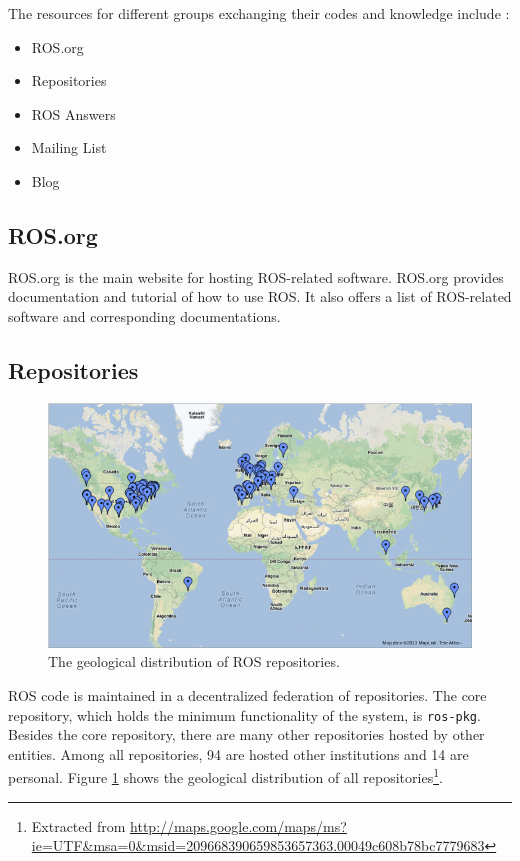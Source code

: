 \documentclass[a4paper, 10pt, conference]{ieeeconf}       %
\begin{document}
The resources for different groups exchanging their codes and knowledge include :
\begin{itemize}
  \item ROS.org
  \item Repositories
  \item ROS Answers
  \item Mailing List
  \item Blog
\end{itemize}

\subsection{ROS.org}
ROS.org is the main website for hosting ROS-related software. ROS.org provides documentation and tutorial of how to use ROS. It also offers a list of ROS-related software and corresponding documentations. 

\subsection{Repositories}

\begin{figure}[tbhp]
  \centering
  \includegraphics[width=.9\textwidth]{repos}
  \caption{The geological distribution of ROS repositories.}
  \label{fig:repos}
\end{figure}

ROS code is maintained in a decentralized federation of repositories. The core repository, which holds the minimum functionality of the system, is \texttt{ros-pkg}. Besides the core repository, there are many other repositories hosted by other entities. Among all repositories, 94 are hosted other institutions and 14 are personal. Figure \ref{fig:repos} shows the geological distribution of all repositories\footnote{Extracted from \url{http://maps.google.com/maps/ms?ie=UTF\&msa=0\&msid=209668390659853657363.00049c608b78bc7779683}}.
\end{document}
